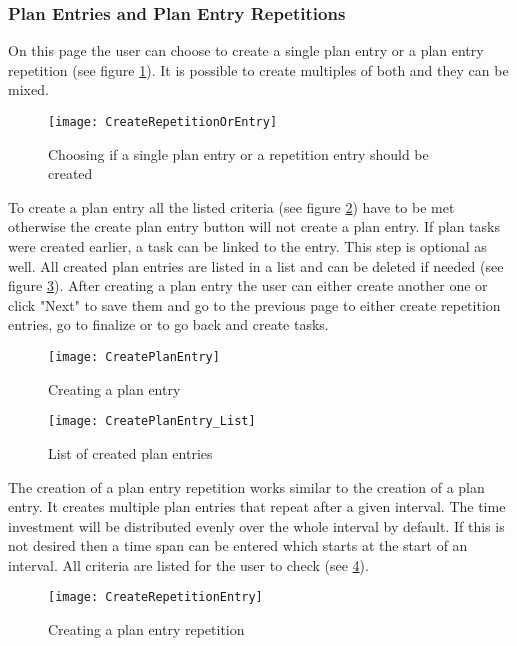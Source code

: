 \subsubsection{Plan Entries and Plan Entry Repetitions}
On this page the user can choose to create a single plan entry or a plan entry repetition (see figure \ref{createRepetitionOrEntry}). It is possible to create multiples of both and they can be mixed.
\begin{figure}[H]
	\centering
	\texttt{[image: CreateRepetitionOrEntry]}
	\caption{Choosing if a single plan entry or a repetition entry should be created}
	\label{createRepetitionOrEntry}
\end{figure}
To create a plan entry all the listed criteria (see figure \ref{createPlanEntry}) have to be met otherwise the create plan entry button will not create a plan entry. If plan tasks were created earlier, a task can be linked to the entry. This step is optional as well. All created plan entries are listed in a list and can be deleted if needed (see figure \ref{createPlanEntry_List}). After creating a plan entry the user can either create another one or click "Next" to save them and go to the previous page to either create repetition entries, go to finalize or to go back and create tasks.
\begin{figure}[H]
	\centering
	\texttt{[image: CreatePlanEntry]}
	\caption{Creating a plan entry}
	\label{createPlanEntry}
\end{figure}
\begin{figure}[H]
	\centering
	\texttt{[image: CreatePlanEntry\_List]}
	\caption{List of created plan entries}
	\label{createPlanEntry_List}
\end{figure}
The creation of a plan entry repetition works similar to the creation of a plan entry. It creates multiple plan entries that repeat after a given interval. The time investment will be distributed evenly over the whole interval by default. If this is not desired then a time span can be entered which starts at the start of an interval. All criteria are listed for the user to check (see \ref{createRepetitionEntry}).
\begin{figure}[H]
	\centering
	\texttt{[image: CreateRepetitionEntry]}
	\caption{Creating a plan entry repetition}
	\label{createRepetitionEntry}
\end{figure}

